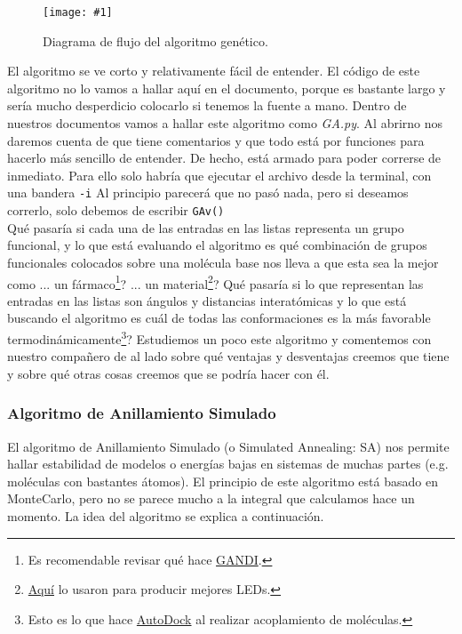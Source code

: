\documentclass[10pt,letterpaper]{article}
\newcommand{\inlinecode}[1]{
\colorbox{light-gray}{\texttt{#1}}
}
\newcommand{\Picture}[3]
{
	\begin{figure}[H]
	\begin{center}
	\caption{#3}
	\texttt{[image: \#1]}
	\end{center}
	\end{figure}
}
\begin{document}
\Picture{img/gen_alg.png}{0.6}{Diagrama de flujo del algoritmo gen\'etico.}

El algoritmo se ve corto y relativamente f\'acil de entender. El c\'odigo de este algoritmo no lo vamos a hallar aqu\'i en el documento, porque es bastante largo y ser\'ia mucho desperdicio colocarlo si tenemos la fuente a mano. Dentro de nuestros documentos vamos a hallar este algoritmo como \textit{GA.py}. Al abrirno nos daremos cuenta de que tiene comentarios y que todo est\'a por funciones para hacerlo m\'as sencillo de entender. De hecho, est\'a armado para poder correrse de inmediato. Para ello solo habr\'ia que ejecutar el archivo desde la terminal, con una bandera \inlinecode{-i} Al principio parecer\'a que no pas\'o nada, pero si deseamos correrlo, solo debemos de escribir \inlinecode{GAv()}\\

Qu\'e pasar\'ia si cada una de las entradas en las listas representa un grupo funcional, y lo que est\'a evaluando el algoritmo es qu\'e combinaci\'on de grupos funcionales colocados sobre una mol\'ecula base nos lleva a que esta sea la mejor como ... un f\'armaco\footnote{Es recomendable revisar qu\'e hace \href{http://pubs.acs.org/doi/abs/10.1021/ci700424b}{GANDI}.}? ... un material\footnote{\href{http://pubs.acs.org/doi/abs/10.1021/cm052179o}{Aqu\'i} lo usaron para producir mejores LEDs.}? Qu\'e pasar\'ia si lo que representan las entradas en las listas son \'angulos y distancias interat\'omicas y lo que est\'a buscando el algoritmo es cu\'al de todas las conformaciones es la m\'as favorable termodin\'amicamente\footnote{Esto es lo que hace \href{http://onlinelibrary.wiley.com/doi/10.1002/jcc.21256/full}{AutoDock} al realizar acoplamiento de mol\'eculas.}? Estudiemos un poco este algoritmo y comentemos con nuestro compa\~nero de al lado sobre qu\'e ventajas y desventajas creemos que tiene y sobre qu\'e otras cosas creemos que se podr\'ia hacer con \'el.

\subsubsection{Algoritmo de Anillamiento Simulado}
El algoritmo de Anillamiento Simulado (o Simulated Annealing: SA) nos permite hallar estabilidad de modelos o energ\'ias bajas en sistemas de muchas partes (e.g. mol\'eculas con bastantes \'atomos). El principio de este algoritmo est\'a basado en MonteCarlo, pero no se parece mucho a la integral que calculamos hace un momento. La idea del algoritmo se explica a continuaci\'on.\\
\end{document}

